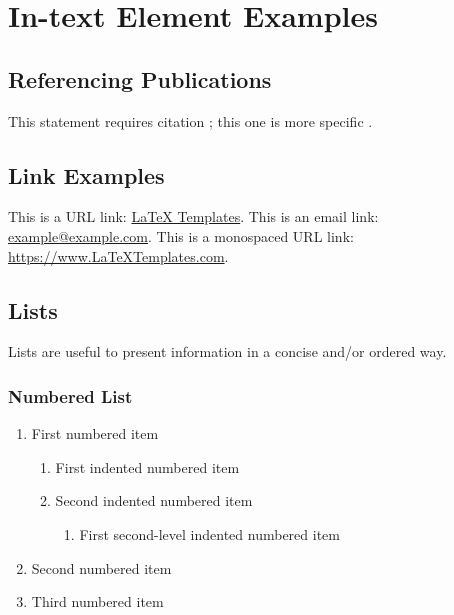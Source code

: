 \chapter{In-text Element Examples}

\section{Referencing Publications}

This statement requires citation \cite{Smith:2022jd}; this one is more specific \cite[162]{Smith:2021qr}.


\section{Link Examples}

This is a URL link: \href{https://www.latextemplates.com}{LaTeX Templates}. This is an email link: \href{mailto:example@example.com}{example@example.com}. This is a monospaced URL link: \url{https://www.LaTeXTemplates.com}.


\section{Lists}

Lists are useful to present information in a concise and/or ordered way.

\subsection{Numbered List}

\begin{enumerate}
	\item First numbered item
	\begin{enumerate}
		\item First indented numbered item
		\item Second indented numbered item
		\begin{enumerate}
			\item First second-level indented numbered item
		\end{enumerate}
	\end{enumerate}
	\item Second numbered item
	\item Third numbered item
\end{enumerate}


